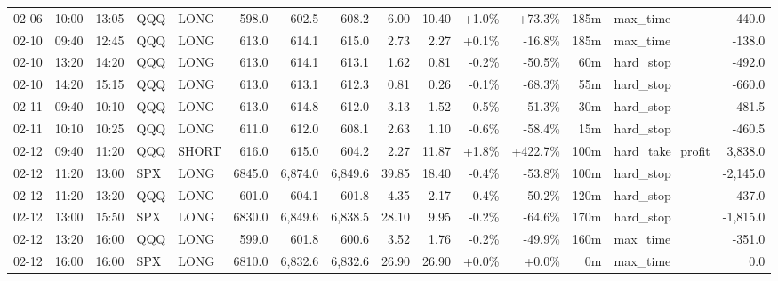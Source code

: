 \documentclass[11pt,a4paper,twoside]{article}
\begin{document}
\begin{landscape}
\begin{center}
\begin{longtable}{>{\color{txtmain}}l l l l l r r r r r r r r >{\color{txtmain}}l r}
02-06 & 10:00 & 13:05 & QQQ & LONG & 598.0 & 602.5 & 608.2 & 6.00 & 10.40 & \textcolor{wingreen}{+1.0\%} & \textcolor{wingreen}{+73.3\%} & 185m & max\_time & \textcolor{wingreen}{440.0} \\
02-10 & 09:40 & 12:45 & QQQ & LONG & 613.0 & 614.1 & 615.0 & 2.73 & 2.27 & \textcolor{wingreen}{+0.1\%} & \textcolor{lossred}{-16.8\%} & 185m & max\_time & \textcolor{lossred}{-138.0} \\
02-10 & 13:20 & 14:20 & QQQ & LONG & 613.0 & 614.1 & 613.1 & 1.62 & 0.81 & \textcolor{lossred}{-0.2\%} & \textcolor{lossred}{-50.5\%} & 60m & hard\_stop & \textcolor{lossred}{-492.0} \\
02-10 & 14:20 & 15:15 & QQQ & LONG & 613.0 & 613.1 & 612.3 & 0.81 & 0.26 & \textcolor{lossred}{-0.1\%} & \textcolor{lossred}{-68.3\%} & 55m & hard\_stop & \textcolor{lossred}{-660.0} \\
02-11 & 09:40 & 10:10 & QQQ & LONG & 613.0 & 614.8 & 612.0 & 3.13 & 1.52 & \textcolor{lossred}{-0.5\%} & \textcolor{lossred}{-51.3\%} & 30m & hard\_stop & \textcolor{lossred}{-481.5} \\
02-11 & 10:10 & 10:25 & QQQ & LONG & 611.0 & 612.0 & 608.1 & 2.63 & 1.10 & \textcolor{lossred}{-0.6\%} & \textcolor{lossred}{-58.4\%} & 15m & hard\_stop & \textcolor{lossred}{-460.5} \\
02-12 & 09:40 & 11:20 & QQQ & SHORT & 616.0 & 615.0 & 604.2 & 2.27 & 11.87 & \textcolor{wingreen}{+1.8\%} & \textcolor{wingreen}{+422.7\%} & 100m & hard\_take\_profit & \textcolor{wingreen}{3,838.0} \\
02-12 & 11:20 & 13:00 & SPX & LONG & 6845.0 & 6,874.0 & 6,849.6 & 39.85 & 18.40 & \textcolor{lossred}{-0.4\%} & \textcolor{lossred}{-53.8\%} & 100m & hard\_stop & \textcolor{lossred}{-2,145.0} \\
02-12 & 11:20 & 13:20 & QQQ & LONG & 601.0 & 604.1 & 601.8 & 4.35 & 2.17 & \textcolor{lossred}{-0.4\%} & \textcolor{lossred}{-50.2\%} & 120m & hard\_stop & \textcolor{lossred}{-437.0} \\
02-12 & 13:00 & 15:50 & SPX & LONG & 6830.0 & 6,849.6 & 6,838.5 & 28.10 & 9.95 & \textcolor{lossred}{-0.2\%} & \textcolor{lossred}{-64.6\%} & 170m & hard\_stop & \textcolor{lossred}{-1,815.0} \\
02-12 & 13:20 & 16:00 & QQQ & LONG & 599.0 & 601.8 & 600.6 & 3.52 & 1.76 & \textcolor{lossred}{-0.2\%} & \textcolor{lossred}{-49.9\%} & 160m & max\_time & \textcolor{lossred}{-351.0} \\
02-12 & 16:00 & 16:00 & SPX & LONG & 6810.0 & 6,832.6 & 6,832.6 & 26.90 & 26.90 & \textcolor{wingreen}{+0.0\%} & \textcolor{wingreen}{+0.0\%} & 0m & max\_time & \textcolor{wingreen}{0.0} \\

\end{longtable}
\end{center}
\end{landscape}
\end{document}
